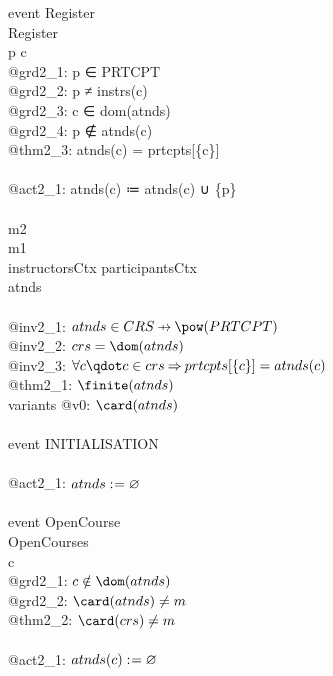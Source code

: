 \begin{description}
\begin{center}
\begin{Bcode}
      \Bconvergent{} event Register \\
      \Brefines{} Register\\
      \Bany{} p c \Bwhere\\
      @grd2_1: p ∈ PRTCPT\\
      @grd2_2: p ≠ instrs(c)\\
      @grd2_3: c ∈ dom(atnds)\\
      @grd2_4: p ∉ atnds(c)\\
      \Btheorem{} @thm2_3: atnds(c) = prtcpts[\{c\}]\\
      \Bthen\\
      @act2_1: atnds(c) ≔ atnds(c) ∪ \{p\}\\
      \Bend\\
      \Bend
      \else
      \Bmachine{} m2\\
      \Brefines{} m1\\
      \Bsees{} instructorsCtx participantsCtx\\
      \Bvariables{} atnds\\
      \Binvariants\\
      \Btab @inv2_1: \(atnds \in CRS \pfun \pow(PRTCPT)\)\\
      \Btab @inv2_2: \(crs = \dom(atnds)\)\\
      \Btab @inv2_3: \(\forall c \qdot c \in crs \limp prtcpts[\{c\}] = atnds(c)\)\\
      \Btab \Btheorem{} @thm2_1: \(\finite(atnds)\)\\
      variants @v0: \(\card(atnds)\)\\
      \Bevents\\
      \Btab event INITIALISATION\\
      \Btab \Bthen\\
      \Btab \Btab @act2_1: \(atnds \mathrel{:\mkern1mu=} \mathord\varnothing\)\\
      \Btab \Bend\\
      \Btab event OpenCourse\\
      \Btab \Brefines{} OpenCourses\\
      \Btab \Bany{} c \Bwhere\\
      \Btab \Btab @grd2_1: \(c \notin \dom(atnds)\)\\
      \Btab \Btab @grd2_2: \(\card(atnds) \neq m\) \\
      \Btab \Btab \Btheorem{} @thm2_2: \(\card(crs) \neq m\)\\
      \Btab \Bthen\\
      \Btab \Btab @act2_1: \(atnds(c) \mathrel{:\mkern1mu=} \mathord\varnothing\)\\

\end{Bcode}
\end{center}
\end{description}
